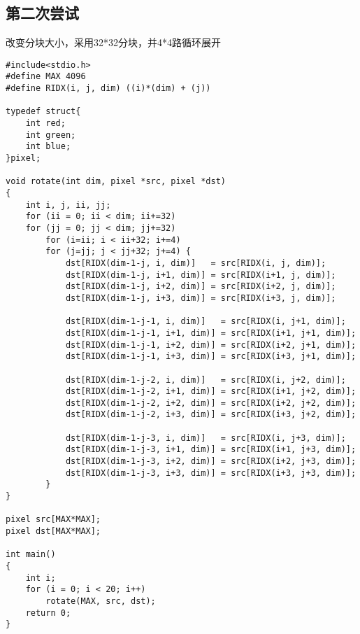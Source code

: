 \documentclass{article}
\begin{document}
\subsection{第二次尝试}
改变分块大小，采用32*32分块，并4*4路循环展开
\begin{lstlisting}
#include<stdio.h>
#define MAX 4096
#define RIDX(i, j, dim) ((i)*(dim) + (j))

typedef struct{
    int red; 
    int green; 
    int blue;
}pixel;

void rotate(int dim, pixel *src, pixel *dst)
{
    int i, j, ii, jj;
    for (ii = 0; ii < dim; ii+=32)
    for (jj = 0; jj < dim; jj+=32)
        for (i=ii; i < ii+32; i+=4)
        for (j=jj; j < jj+32; j+=4) {
            dst[RIDX(dim-1-j, i, dim)]   = src[RIDX(i, j, dim)];
            dst[RIDX(dim-1-j, i+1, dim)] = src[RIDX(i+1, j, dim)];
            dst[RIDX(dim-1-j, i+2, dim)] = src[RIDX(i+2, j, dim)];
            dst[RIDX(dim-1-j, i+3, dim)] = src[RIDX(i+3, j, dim)];
            
            dst[RIDX(dim-1-j-1, i, dim)]   = src[RIDX(i, j+1, dim)];
            dst[RIDX(dim-1-j-1, i+1, dim)] = src[RIDX(i+1, j+1, dim)];
            dst[RIDX(dim-1-j-1, i+2, dim)] = src[RIDX(i+2, j+1, dim)];
            dst[RIDX(dim-1-j-1, i+3, dim)] = src[RIDX(i+3, j+1, dim)];
            
            dst[RIDX(dim-1-j-2, i, dim)]   = src[RIDX(i, j+2, dim)];
            dst[RIDX(dim-1-j-2, i+1, dim)] = src[RIDX(i+1, j+2, dim)];
            dst[RIDX(dim-1-j-2, i+2, dim)] = src[RIDX(i+2, j+2, dim)];
            dst[RIDX(dim-1-j-2, i+3, dim)] = src[RIDX(i+3, j+2, dim)];
            
            dst[RIDX(dim-1-j-3, i, dim)]   = src[RIDX(i, j+3, dim)];
            dst[RIDX(dim-1-j-3, i+1, dim)] = src[RIDX(i+1, j+3, dim)];
            dst[RIDX(dim-1-j-3, i+2, dim)] = src[RIDX(i+2, j+3, dim)];
            dst[RIDX(dim-1-j-3, i+3, dim)] = src[RIDX(i+3, j+3, dim)];
        }
}

pixel src[MAX*MAX];
pixel dst[MAX*MAX];

int main() 
{
    int i;
    for (i = 0; i < 20; i++)
        rotate(MAX, src, dst);
    return 0;
}
\end{lstlisting}
\end{document}
